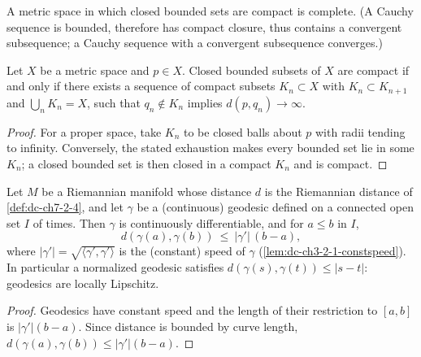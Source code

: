\begin{lemma}

  \label{lem:dc-ch7-2-8-b-to-c}
  \mathlibok
A metric space in which closed bounded sets are compact is complete. (A
  Cauchy sequence is bounded, therefore has compact closure, thus contains a
  convergent subsequence; a Cauchy sequence with a convergent subsequence
  converges.)
\end{lemma}

\begin{lemma}

  \label{lem:dc-ch7-2-8-b-iff-e}
  \leanok
Let $X$ be a metric space and $p\in X$. Closed bounded subsets of $X$ are
  compact if and only if there exists a sequence of compact subsets
  $K_n\subset X$ with $K_n\subset K_{n+1}$ and $\bigcup_n K_n=X$, such that
  $q_n\notin K_n$ implies $d(p,q_n)\to\infty$.
\begin{proof}

  \leanok
\sketch For a proper space, take $K_n$ to be closed balls about $p$ with radii tending to infinity. Conversely, the stated exhaustion makes every bounded set lie in some $K_n$; a closed bounded set is then closed in a compact $K_n$ and is compact.
\end{proof}
\end{lemma}

\begin{lemma}

  \label{lem:dc-ch7-2-8-lipschitz}
  \leanok
Let $M$ be a Riemannian manifold whose distance $d$ is the Riemannian
  distance of \cref{def:dc-ch7-2-4}, and let $\gamma$ be a (continuous)
  geodesic defined on a connected open set $I$ of times. Then $\gamma$ is
  continuously differentiable, and for $a\le b$ in $I$,
  $$
  d(\gamma(a),\gamma(b))\ \le\ |\gamma'|\,(b-a),
  $$
  where $|\gamma'|=\sqrt{\langle\gamma',\gamma'\rangle}$ is the (constant)
  speed of $\gamma$ (\cref{lem:dc-ch3-2-1-constspeed}). In particular a
  normalized geodesic satisfies $d(\gamma(s),\gamma(t))\le|s-t|$: geodesics
  are locally Lipschitz.
\begin{proof}

  \leanok
\sketch Geodesics have constant speed and the length of their restriction to $[a,b]$ is $|\gamma'|(b-a)$. Since distance is bounded by curve length, $d(\gamma(a),\gamma(b))\le |\gamma'|(b-a)$.
\end{proof}
\end{lemma}

